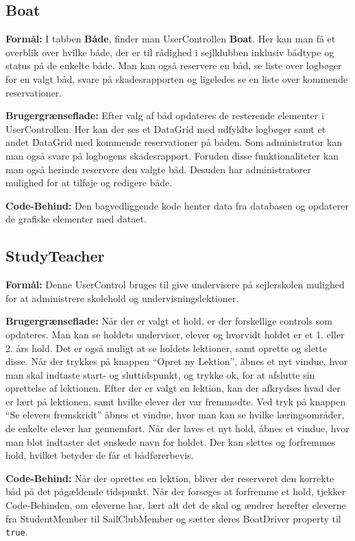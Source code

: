 \subsection{Boat}

\textbf{Formål:}
I tabben \textbf{Både}, finder man UserControllen \textbf{Boat}.
Her kan man få et overblik over hvilke både, der er til rådighed i sejlklubben inklusiv bådtype og status på de enkelte både.
Man kan også reservere en båd, se liste over logbøger for en valgt båd, svare på skadesrapporten og ligeledes se en liste over kommende reservationer. 

\textbf{Brugergrænseflade:}
Efter valg af båd opdateres de resterende elementer i UserControllen. 
Her kan der ses et DataGrid med udfyldte logbøger samt et andet DataGrid med kommende reservationer på båden.
Som administrator kan man også svare på logbogens skadesrapport.
Foruden disse funktionaliteter kan man også herinde reservere den valgte båd.
Desuden har administratorer mulighed for at tilføje og redigere både.

\textbf{Code-Behind:}
Den bagvedliggende kode henter data fra databasen og opdaterer de grafiske elementer med dataet.

\subsection{StudyTeacher}

\textbf{Formål:}
Denne UserControl bruges til give undervisere på sejlerskolen mulighed for at administrere skolehold og undervisningslektioner.

\textbf{Brugergrænseflade:}
Når der er valgt et hold, er der forskellige controls som opdateres.
Man kan se holdets underviser, elever og hvorvidt holdet er et 1. eller 2. års hold. 
Det er også muligt at se holdets lektioner, samt oprette og slette disse.
Når der trykkes på knappen ``Opret ny Lektion'', åbnes et nyt vindue, hvor man skal indtaste start- og sluttidspunkt, og trykke ok, for at afslutte sin oprettelse af lektionen.
Efter der er valgt en lektion, kan der afkrydses hvad der er lært på lektionen, samt hvilke elever der var fremmødte.
Ved tryk på knappen ``Se elevers fremskridt'' åbnes et vindue, hvor man kan se hvilke læringsområder, de enkelte elever har gennemført.
Når der laves et nyt hold, åbnes et vindue, hvor man blot indtaster det ønskede navn for holdet.
Der kan slettes og forfremmes hold, hvilket betyder de får et bådførerbevis.

\textbf{Code-Behind:}
Når der oprettes en lektion, bliver der reserveret den korrekte båd på det pågældende tidspunkt.
Når der forsøges at forfremme et hold, tjekker Code-Behinden, om eleverne har, lært alt det de skal og ændrer herefter eleverne fra StudentMember til SailClubMember og sætter deres BoatDriver property til \texttt{true}.

